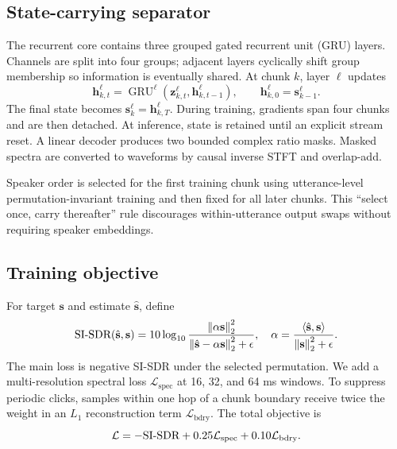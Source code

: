 \subsection{State-carrying separator}

The recurrent core contains three grouped gated recurrent unit (GRU) layers.
Channels are split into four groups; adjacent layers cyclically shift group
membership so information is eventually shared.  At chunk $k$, layer $\ell$
updates
\begin{equation}
 \mathbf{h}^{\ell}_{k,t}
 = \operatorname{GRU}^{\ell}(\mathbf{z}^{\ell}_{k,t},
   \mathbf{h}^{\ell}_{k,t-1}), \qquad
 \mathbf{h}^{\ell}_{k,0}=\mathbf{s}^{\ell}_{k-1}.
 \label{eq:gru}
\end{equation}
The final state becomes $\mathbf{s}^{\ell}_k=\mathbf{h}^{\ell}_{k,T}$.  During
training, gradients span four chunks and are then detached.  At inference, state
is retained until an explicit stream reset.  A linear decoder produces two
bounded complex ratio masks.  Masked spectra are converted to waveforms by
causal inverse STFT and overlap-add.

Speaker order is selected for the first training chunk using utterance-level
permutation-invariant training and then fixed for all later chunks.  This
``select once, carry thereafter'' rule discourages within-utterance output swaps
without requiring speaker embeddings.

\subsection{Training objective}

For target $\mathbf{s}$ and estimate $\hat{\mathbf{s}}$, define
\begin{equation}
 \text{SI-SDR}(\hat{\mathbf{s}},\mathbf{s})
 =10\log_{10}\frac{\left\lVert \alpha\mathbf{s}\right\rVert_2^2}
 {\left\lVert \hat{\mathbf{s}}-\alpha\mathbf{s}\right\rVert_2^2+\epsilon},\quad
 \alpha=\frac{\langle\hat{\mathbf{s}},\mathbf{s}\rangle}
 {\left\lVert \mathbf{s}\right\rVert_2^2+\epsilon}.
\end{equation}
The main loss is negative SI-SDR under the selected permutation.  We add a
multi-resolution spectral loss $\mathcal{L}_{\mathrm{spec}}$ at 16, 32, and
64 ms windows.  To suppress periodic clicks, samples within one hop of a chunk
boundary receive twice the weight in an $L_1$ reconstruction term
$\mathcal{L}_{\mathrm{bdry}}$.  The total objective is
\begin{equation}
 \mathcal{L}=-\text{SI-SDR}+0.25\mathcal{L}_{\mathrm{spec}}
             +0.10\mathcal{L}_{\mathrm{bdry}}.
 \label{eq:loss}
\end{equation}
